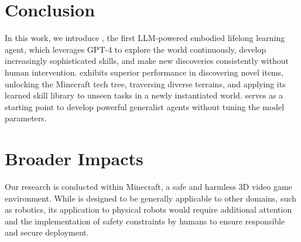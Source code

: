 \section{Conclusion}
\label{sec:conclusion}

In this work, we introduce \voyager, the first LLM-powered embodied lifelong learning agent, which leverages GPT-4 to explore the world continuously, develop increasingly sophisticated skills, and make new discoveries consistently without human intervention. \voyager exhibits superior performance in discovering novel items, unlocking the Minecraft tech tree, traversing diverse terrains, and applying its learned skill library to unseen tasks in a newly instantiated world. \voyager serves as a starting point to develop powerful generalist agents without tuning the model parameters.

\section{Broader Impacts}
\label{sec:broader}
Our research is conducted within Minecraft, a safe and harmless 3D video game environment. While \voyager is designed to be generally applicable to other domains, such as robotics, its application to physical robots would require additional attention and the implementation of safety constraints by humans to ensure responsible and secure deployment.